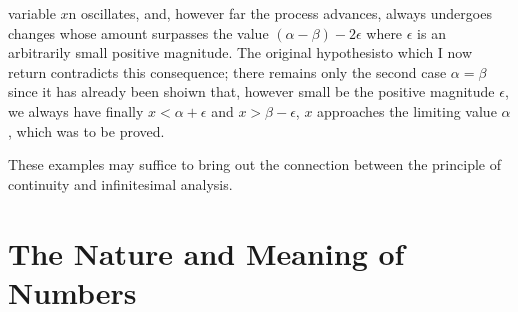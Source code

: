 \documentclass[oneside,12pt]{book}
\begin{document}
variable $x$n oscillates, and, however far the process advances, always undergoes changes whose amount surpasses the value $(\alpha-\beta)-2\epsilon$ where $\epsilon$ is an arbitrarily small positive magnitude. The original hypothesisto which I now return contradicts this consequence; there remains only the second case $\alpha=\beta$ since it has already been shoiwn that, however small be the positive magnitude $\epsilon$, we always have finally $x<\alpha+\epsilon$ and $x>\beta-\epsilon$, $x$ approaches the limiting value $\alpha$, which was to be proved. \par 

These examples may suffice to bring out the connection between the principle of continuity and infinitesimal analysis. \par 

\chapter{The Nature and Meaning of Numbers}
\end{document}
